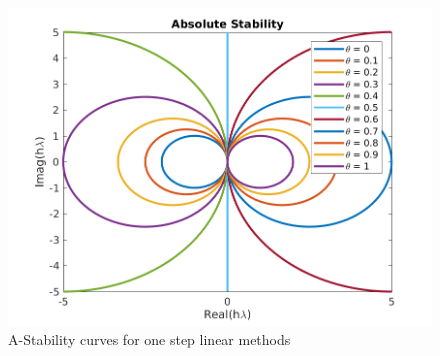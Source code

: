 \documentclass[12pt]{article}
\theoremstyle{remark}
\begin{document}
\begin{figure}[H]
	\centering
	\includegraphics[]{5_2_3.png}
	\caption{A-Stability curves for one step linear methods}
\end{figure}
\end{document}
